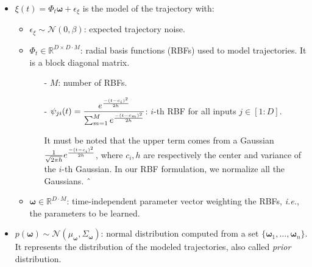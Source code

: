 \documentclass[utf8]{frontiersSCNS} %
\newcommand{\rev}[1]{\textcolor{blue}{#1}}
\newcommand{\todo}[1]{\textcolor{red}{\textbf{/*#1*/}}}
\begin{document}
\begin{itemize}
	\item $\xi(t) = \Phi_t \boldsymbol{\omega} + \epsilon_\xi$ is the model of the trajectory with:
	\begin{itemize}
		\item $\epsilon_\xi \sim \mathcal{N}(0, \beta)$: expected trajectory noise.
		\item $\Phi_t \in \mathbb{R}^{D\times D \cdot M}$: radial basis functions (RBFs) used to model trajectories. It is a block diagonal matrix.
		\begin{itemize}
			\item[-] $M$: number of RBFs.
			\item[-] $ \psi_{ji}(t) =\dfrac{e^{-(t - c_i)^2 \over 2h}}{\sum_{m=1}^{M} e^{-(t - c_m)^2 \over 2h} }$: $i$-th RBF for all inputs $j \in [1:D]$. 
			
			It must be noted that the upper term comes from a Gaussian $\frac{1}{\sqrt{2\pi h}} e^{-(t - c_i)^2 \over 2h}$, where $ c_i, h$ are respectively the center and variance of the $i$-th Gaussian. In our RBF formulation, we normalize all the Gaussians.
			ˆ%
		\end{itemize}
		\item $\boldsymbol{\omega} \in \mathbb{R}^{D \cdot M}$: time-independent parameter vector weighting the RBFs, \textit{i.e.}, the parameters to be learned.
		
	\end{itemize}
	
	\item $p(\boldsymbol{\omega}) \sim \mathcal{N}(\mu_{\boldsymbol{\omega}}, \Sigma_{\boldsymbol{\omega}})$: normal distribution computed from a set $\{\boldsymbol{\omega}_1, \ldots, \boldsymbol{\omega}_n\}$. It represents the distribution of the modeled trajectories, also called \textit{prior} distribution.
	
	
	
\end{itemize}
\end{document}
